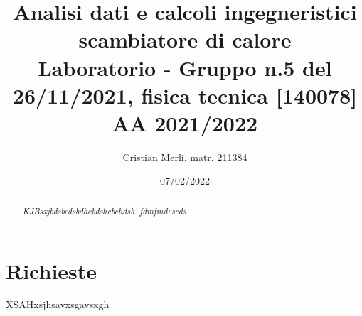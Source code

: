 \documentclass{article}                                                                                                     %
\title{Analisi dati e calcoli ingegneristici scambiatore di calore \\                                                       %
\large Laboratorio - Gruppo n.5 del 26/11/2021, fisica tecnica [140078] AA 2021/2022}                                       %
\author{Cristian Merli, matr. 211384}                                                                                       %
\date{07/02/2022}                                                                                                           %
\begin{document}

\maketitle                                                                                                                  %

\vspace{1cm}                                                                                                                %
  \begin{abstract}                                                                                                          %
    \noindent \textit{KJBsxjbdsbcdsbdhcbdshcbchdsb.                                                                         %
    fdmfmdcscds.}
  \end{abstract}                                                                                                            %
\vspace{3.5cm}                                                                                                              %

\vspace{3.5cm}                                                                                                              %
  \tableofcontents                                                                                                          %
\pagebreak                                                                                                                  %

\section{Richieste}                                                                                                         %
\label{sec:project_request}                                                                                                 %
  XSAHxsjhsavxsgavsxgh                                                                                                      %
\end{document}
